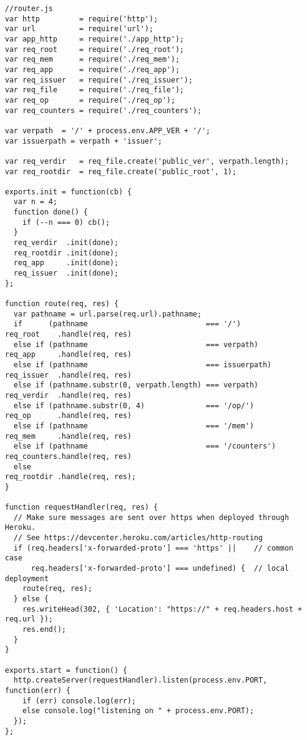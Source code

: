 \begin{lstlisting}
//router.js
var http         = require('http');
var url          = require('url');
var app_http     = require('./app_http');
var req_root     = require('./req_root');
var req_mem      = require('./req_mem');
var req_app      = require('./req_app');
var req_issuer   = require('./req_issuer');
var req_file     = require('./req_file');
var req_op       = require('./req_op');
var req_counters = require('./req_counters');

var verpath  = '/' + process.env.APP_VER + '/';
var issuerpath = verpath + 'issuer';

var req_verdir   = req_file.create('public_ver', verpath.length);
var req_rootdir  = req_file.create('public_root', 1);

exports.init = function(cb) {
  var n = 4;
  function done() {
    if (--n === 0) cb();
  }
  req_verdir  .init(done);
  req_rootdir .init(done);
  req_app     .init(done);
  req_issuer  .init(done);
};

function route(req, res) {
  var pathname = url.parse(req.url).pathname;
  if      (pathname                           === '/')             req_root    .handle(req, res)
  else if (pathname                           === verpath)         req_app     .handle(req, res)
  else if (pathname                           === issuerpath)      req_issuer  .handle(req, res)
  else if (pathname.substr(0, verpath.length) === verpath)         req_verdir  .handle(req, res)
  else if (pathname.substr(0, 4)              === '/op/')          req_op      .handle(req, res)
  else if (pathname                           === '/mem')          req_mem     .handle(req, res)
  else if (pathname                           === '/counters')     req_counters.handle(req, res)
  else                                                             req_rootdir .handle(req, res);
}

function requestHandler(req, res) {
  // Make sure messages are sent over https when deployed through Heroku.
  // See https://devcenter.heroku.com/articles/http-routing
  if (req.headers['x-forwarded-proto'] === 'https' ||    // common case
      req.headers['x-forwarded-proto'] === undefined) {  // local deployment
    route(req, res);
  } else {
    res.writeHead(302, { 'Location': "https://" + req.headers.host + req.url });
    res.end();
  }
}

exports.start = function() {
  http.createServer(requestHandler).listen(process.env.PORT, function(err) {
    if (err) console.log(err);
    else console.log("listening on " + process.env.PORT);
  });
};
\end{lstlisting}


